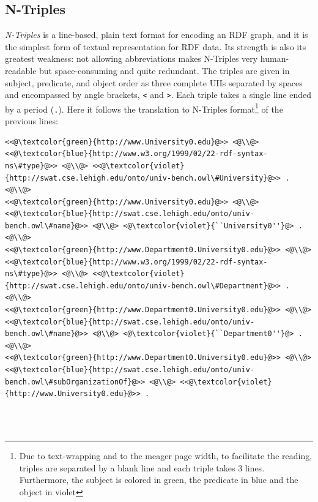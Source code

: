 \documentclass[10pt, a4paper]{report}
\begin{document}
\subsection{N-Triples}

\textit{N-Triples} is a line-based, plain text format for encoding an RDF graph, and it is the simplest form of textual representation for RDF data. Its strength is also its greatest weakness: not allowing abbreviations makes N-Triples very human-readable but space-consuming and quite redundant. The triples are given in subject, predicate, and object order as three complete UIIs separated by spaces and encompassed by angle brackets, \texttt{<} and \texttt{>}. Each triple takes a single line ended by a period (\texttt{.}). Here it follows the translation to N-Triples format\footnote{Due to text-wrapping and to the meager page width, to facilitate the reading, triples are separated by a blank line and each triple takes 3 lines. Furthermore, the subject is colored in green, the predicate in blue and the object in violet} of the previous lines: \\

\begin{minipage}{0.92\textwidth}
	\begin{lstlisting}
<<@\textcolor{green}{http://www.University0.edu}@>> <@\\@> <<@\textcolor{blue}{http://www.w3.org/1999/02/22-rdf-syntax-ns\#type}@>> <@\\@> <<@\textcolor{violet}{http://swat.cse.lehigh.edu/onto/univ-bench.owl\#University}@>> . <@\\@>
<<@\textcolor{green}{http://www.University0.edu}@>> <@\\@> <<@\textcolor{blue}{http://swat.cse.lehigh.edu/onto/univ-bench.owl\#name}@>> <@\\@> <@\textcolor{violet}{``University0''}@> . <@\\@>
<<@\textcolor{green}{http://www.Department0.University0.edu}@>> <@\\@> <<@\textcolor{blue}{http://www.w3.org/1999/02/22-rdf-syntax-ns\#type}@>> <@\\@> <<@\textcolor{violet}{http://swat.cse.lehigh.edu/onto/univ-bench.owl\#Department}@>> . <@\\@>
<<@\textcolor{green}{http://www.Department0.University0.edu}@>> <@\\@> <<@\textcolor{blue}{http://swat.cse.lehigh.edu/onto/univ-bench.owl\#name}@>> <@\\@> <@\textcolor{violet}{``Department0''}@> .<@\\@>
<<@\textcolor{green}{http://www.Department0.University0.edu}@>> <@\\@> <<@\textcolor{blue}{http://swat.cse.lehigh.edu/onto/univ-bench.owl\#subOrganizationOf}@>> <@\\@> <<@\textcolor{violet}{http://www.University0.edu}@>> .
                \end{lstlisting}
\end{minipage} \\
\\
\end{document}
